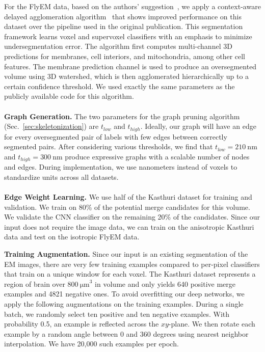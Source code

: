 For the FlyEM data, based on the authors' suggestion~\cite{takemura2017connectome}, we apply a context-aware delayed agglomeration algorithm~\cite{10.1371/journal.pone.0125825} that shows improved performance on this dataset over the pipeline used in the original publication. 
This segmentation framework learns voxel and supervoxel classifiers with an emphasis to minimize undersegmentation error. 
The algorithm first computes multi-channel 3D predictions for membranes, cell interiors, and mitochondria, among other cell features. 
The membrane prediction channel is used to produce an oversegmented volume using 3D watershed, which is then agglomerated hierarchically up to a certain confidence threshold. 
We used exactly the same parameters as the publicly available code for this algorithm.
\\~\\
\noindent\textbf{Graph Generation.}
The two parameters for the graph pruning algorithm (Sec.~\ref{sec:skeletonization}) are $t_{low}$ and $t_{high}$. 
Ideally, our graph will have an edge for every oversegmented pair of labels with few edges between correctly segmented pairs. 
After considering various thresholds, we find that $t_{low} = \SI{210}{\nano\meter}$ and $t_{high} = \SI{300}{\nano\meter}$ produce expressive graphs with a scalable number of nodes and edges.
During implementation, we use nanometers instead of voxels to standardize units across all datasets.
\\~\\
\noindent\textbf{Edge Weight Learning.}
\label{sec:network-parameters}
We use half of the Kasthuri dataset for training and validation. 
We train on 80\% of the potential merge candidates for this volume.
We validate the CNN classifier on the remaining 20\% of the candidates. 
Since our input does not require the image data, we can train on the anisotropic Kasthuri data and test on the isotropic FlyEM data.

\noindent\textbf{Training Augmentation.}
Since our input is an existing segmentation of the EM images, there are very few training examples compared to per-pixel classifiers that train on a unique window for each voxel. 
The Kasthuri dataset represents a region of brain over $\SI[product-units=single]{800}{\micro\meter}^3$ in volume and only yields 640 positive merge examples and 4821 negative ones.
To avoid overfitting our deep networks, we apply the following augmentations on the training examples.
During a single batch, we randomly select ten positive and ten negative examples. 
With probability 0.5, an example is reflected across the $xy$-plane. 
We then rotate each example by a random angle between $0$ and $360$ degrees using nearest neighbor interpolation. 
We have 20,000 such examples per epoch.

